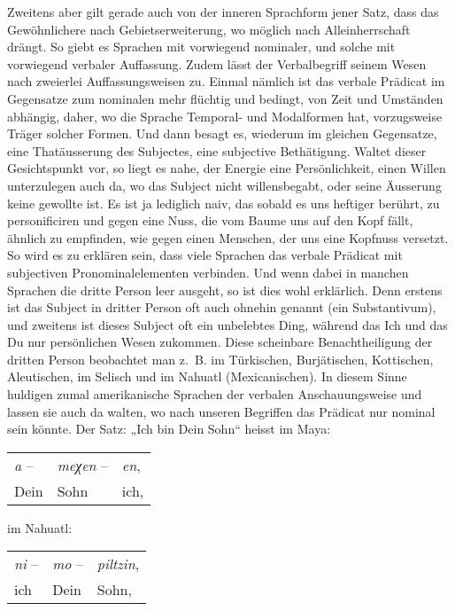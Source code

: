 Zweitens aber gilt gerade auch von der inneren Sprachform jener Satz, dass das Gewöhnlichere nach Gebietserweiterung, wo möglich nach Alleinherrschaft drängt. So giebt es Sprachen mit vorwiegend nominaler, und solche mit vorwiegend verbaler Auffassung. Zudem lässt der Verbalbegriff seinem Wesen nach zweierlei Auffassungsweisen zu. Einmal \label{fp.368} nämlich ist das verbale Prädicat im Gegensatze zum nominalen mehr flüchtig und bedingt, von Zeit und Umständen abhängig, daher, wo die Sprache Temporal- und Modalformen hat, vorzugsweise Träger solcher Formen. Und dann besagt es, wiederum im gleichen Gegensatze, eine Thatäusserung des Subjectes, eine subjective Bethätigung. Waltet dieser Gesichtspunkt vor, so liegt es nahe, der Energie eine Persönlichkeit, einen Willen unterzulegen auch da, wo das Subject nicht willensbegabt, oder seine Äusserung keine gewollte ist. Es ist ja lediglich naiv, das  sobald es uns heftiger berührt, zu personificiren und gegen eine Nuss, die vom Baume uns auf den Kopf fällt, ähnlich zu empfinden, wie gegen einen Menschen, der uns eine Kopfnuss versetzt. So wird es zu erklären sein, dass viele Sprachen das verbale Prädicat mit subjectiven Pronominalelementen verbinden. Und wenn dabei in manchen Sprachen die dritte Person leer ausgeht, so ist dies wohl erklärlich. Denn erstens ist das Subject in dritter Person oft auch ohnehin genannt (ein Substantivum), und zweitens ist dieses Subject oft ein unbelebtes Ding, während das Ich und das Du nur persönlichen Wesen zukommen. Diese scheinbare Benachtheiligung der dritten Person beobachtet man z.~B. im  Türkischen, Burjätischen, Kottischen, Aleutischen, im Selisch und im Nahuatl (Mexicanischen). In diesem Sinne huldigen zumal amerikanische Sprachen der verbalen Anschauungsweise und lassen sie auch da walten, wo nach unseren Begriffen das Prädicat nur nominal sein könnte. Der Satz: „Ich bin Dein Sohn“ heisst im Maya:


\begin{table}[H]
\centering
\tabcolsep=0.04cm
\begin{tabular}{l l l}
\textit{a} – & \textit{meχen} – & \textit{en},\\
Dein & Sohn & ich,
\end{tabular}
\end{table}

\noindent im Nahuatl:

\begin{table}[H]
\centering
\tabcolsep=0.04cm
\begin{tabular}{l l l}
\textit{ni} – & \textit{mo} – & \textit{piltzin},\\
ich & Dein & Sohn,
\end{tabular}
\end{table}

